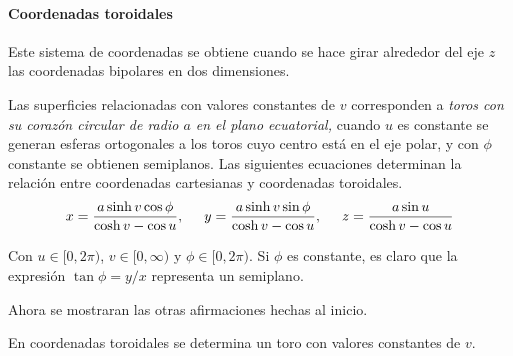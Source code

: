\paragraph*{Coordenadas toroidales} 
Este sistema de coordenadas se obtiene cuando se hace girar alrededor del eje $z$
las coordenadas bipolares en dos dimensiones.

Las superficies relacionadas con valores constantes de $v$ corresponden a \emph{toros con su
corazón circular de radio $a$ en el plano ecuatorial,} cuando $u$ es constante se generan esferas ortogonales
a los toros cuyo centro está en el eje polar, y con $\phi$ constante se obtienen semiplanos.
Las siguientes ecuaciones determinan la relación entre coordenadas cartesianas y coordenadas toroidales.
\begin{equation}
x = \frac{a\sinh v\cos \phi }{\cosh v-\cos u},\hskip0.5cm y =\frac{a\sinh v\sin \phi }{\cosh v-\cos u}, \hskip0.5cm z = \frac{a\sin u}{\cosh v-\cos u}
\end{equation}

Con $u\in [0,2\pi )$, $v\in [0,\infty )$ y $\phi \in [0,2\pi )$.
Si $\phi $ es constante, es claro que la expresión $\tan \phi =y/x$ representa un semiplano.

Ahora se mostraran las otras afirmaciones hechas al inicio.

\begin{prop}
En coordenadas toroidales se determina un toro con valores constantes de $v$.
\end{prop}

